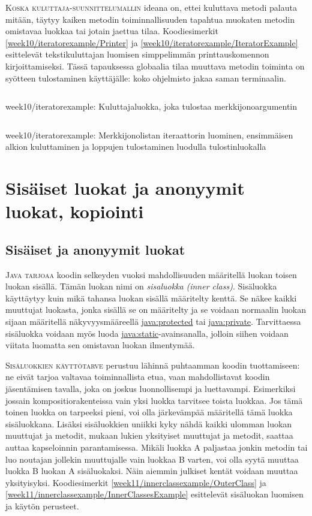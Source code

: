 \documentclass[openany]{book}
\newcommand{\newthought}[1]{\smallskip\textsc{#1}}
\newcommand{\eng}[1]{\textit{(#1)}}
\newcommand{\new}[1]{\textit{\gls{#1}}}
\newcommand{\neweng}[2]{\new{#1} \eng{#2}}
\newcommand{\java}[1]{\underline{\gls{java:#1}}}
\newcommand{\code}[3]{
	\begin{listing}
		\linespread{0.85}
		\inputminted{java}{OhjelmointiopasEsimerkit/src/#1/#2.java}
		\caption{#1: #3}
		\label{#1/#2}
	\end{listing}
}
\begin{document}
\newthought{Koska \gls{kuluttaja}-suunnittelumallin} ideana on, ettei kuluttava metodi palauta
mitään, täytyy kaiken metodin toiminnallisuuden tapahtua muokaten metodin omistavaa luokkaa tai
jotain jaettua tilaa. Koodiesimerkit \ref{week10/iteratorexample/Printer} ja
\ref{week10/iteratorexample/IteratorExample} esittelevät tekstikuluttajan luomisen simppelimmän
printtauskomennon kirjoittamiseksi. Tässä tapauksessa globaalia tilaa muuttava metodin toiminta on
syötteen tulostaminen käyttäjälle: koko ohjelmisto jakaa saman terminaalin.

\code{week10/iteratorexample}{Printer}{Kuluttajaluokka, joka tulostaa merkkijonoargumentin}
\code{week10/iteratorexample}{IteratorExample}{Merkkijonolistan iteraattorin luominen, ensimmäisen
alkion kuluttaminen ja loppujen tulostaminen luodulla tulostinluokalla}


\chapter{Sisäiset luokat ja anonyymit luokat, kopiointi}
\label{innerClasses+copying}

\section{Sisäiset ja anonyymit luokat}
\label{innerClasses}

\newthought{Java tarjoaa} koodin selkeyden vuoksi mahdollisuuden määritellä luokan toisen luokan
sisällä. Tämän luokan nimi on \neweng{sisaluokka}{inner class}. Sisäluokka käyttäytyy kuin mikä
tahansa luokan sisällä määritelty kenttä. Se näkee kaikki muuttujat luokasta, jonka sisällä se on 
määritelty ja se voidaan normaalin luokan sijaan määritellä näkyvyysmääreellä \java{protected} tai
\java{private}. Tarvittaessa sisäluokka voidaan myös luoda \java{static}-avainsanalla, jolloin
siihen voidaan viitata luomatta sen omistavan luokan ilmentymää.

\newthought{Sisäluokkien käyttötarve} perustuu lähinnä puhtaamman koodin tuottamiseen: ne eivät
tarjoa valtavaa toiminnallista etua, vaan mahdollistavat koodin jäsentämisen tavalla, joka on
joskus luonnollisempi ja luettavampi. Esimerkiksi jossain \gls{kompositio}rakenteissa vain
yksi luokka tarvitsee toista luokkaa. Jos tämä toinen luokka on tarpeeksi pieni, voi olla
järkevämpää määritellä tämä luokka sisäluokkana. Lisäksi sisäluokkien uniikki kyky nähdä kaikki 
ulomman luokan muuttujat ja metodit, mukaan lukien yksityiset muuttujat ja metodit, saattaa auttaa
kapseloinnin parantamisessa. Mikäli luokka A paljastaa jonkin metodin tai luo noutajan jollekin
muuttujalle vain luokkaa B varten, voi olla syytä muuttaa luokka B luokan A sisäluokaksi. Näin
aiemmin julkiset kentät voidaan muuttaa yksityisyksi. Koodiesimerkit
\ref{week11/innerclassexample/OuterClass} ja \ref{week11/innerclassexample/InnerClassesExample}
esittelevät sisäluokan luomisen ja käytön perusteet.
\end{document}
